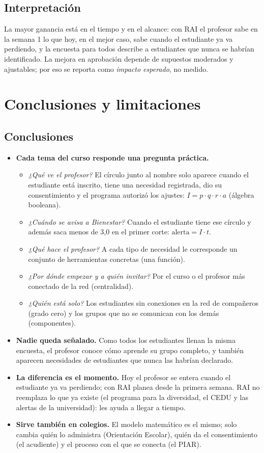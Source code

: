 \documentclass[12pt,letterpaper]{article}
\begin{document}
\subsection{Interpretación}
La mayor ganancia está en el tiempo y en el alcance: con RAI el profesor sabe en la semana 1 lo que hoy, en el mejor caso, sabe cuando el estudiante ya va perdiendo, y la encuesta para todos describe a estudiantes que nunca se habrían identificado. La mejora en aprobación depende de supuestos moderados y ajustables; por eso se reporta como \emph{impacto esperado}, no medido.

\section{Conclusiones y limitaciones}

\subsection{Conclusiones}
\begin{itemize}
  \item \textbf{Cada tema del curso responde una pregunta práctica.}
  \begin{itemize}
    \item \emph{¿Qué ve el profesor?} El círculo junto al nombre solo aparece cuando el estudiante está inscrito, tiene una necesidad registrada, dio su consentimiento y el programa autorizó los ajustes: $I=p\cdot q\cdot r\cdot a$ (álgebra booleana).
    \item \emph{¿Cuándo se avisa a Bienestar?} Cuando el estudiante tiene ese círculo y además saca menos de 3,0 en el primer corte: $\text{alerta}=I\cdot t$.
    \item \emph{¿Qué hace el profesor?} A cada tipo de necesidad le corresponde un conjunto de herramientas concretas (una función).
    \item \emph{¿Por dónde empezar y a quién invitar?} Por el curso o el profesor más conectado de la red (centralidad).
    \item \emph{¿Quién está solo?} Los estudiantes sin conexiones en la red de compañeros (grado cero) y los grupos que no se comunican con los demás (componentes).
  \end{itemize}
  \item \textbf{Nadie queda señalado.} Como todos los estudiantes llenan la misma encuesta, el profesor conoce cómo aprende su grupo completo, y también aparecen necesidades de estudiantes que nunca las habrían declarado.
  \item \textbf{La diferencia es el momento.} Hoy el profesor se entera cuando el estudiante ya va perdiendo; con RAI planea desde la primera semana. RAI no reemplaza lo que ya existe (el programa para la diversidad, el CEDU y las alertas de la universidad): les ayuda a llegar a tiempo.
  \item \textbf{Sirve también en colegios.} El modelo matemático es el mismo; solo cambia quién lo administra (Orientación Escolar), quién da el consentimiento (el acudiente) y el proceso con el que se conecta (el PIAR).
\end{itemize}
\end{document}
